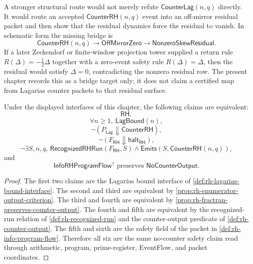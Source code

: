 \begin{remark}
\label{rem:rh-residual-bridge-target}
A stronger structural route would not merely refute
$\mathsf{CounterLag}(n,q)$ directly.  It would route an accepted
$\mathsf{CounterRH}(n,q)$ event into an off-mirror residual packet and then
show that the residual dynamics force the residual to vanish.  In schematic
form the missing bridge is
$$
\mathsf{CounterRH}(n,q)
\to
\mathsf{OffMirrorZero}
\to
\mathsf{NonzeroSkewResidual}.
$$
If a later Zeckendorf or finite-window projection tower supplied a return rule
$R(\Delta)=-\frac{1}{2}\Delta$ together with a zero-event safety rule
$R(\Delta)=\Delta$, then the residual would satisfy $\Delta=0$, contradicting
the nonzero residual row.  The present chapter records this as a bridge
target only; it does not claim a certified map from Lagarias counter packets
to that residual surface.
\end{remark}

\begin{theorem}
\label{thm:rh-information-halting-normal-form}
Under the displayed interfaces of this chapter, the following claims are
equivalent:
$$
\mathsf{RH},
$$
$$
\forall n\geq 1,\ \mathsf{LagBound}(n),
$$
$$
\neg(P_{\mathsf{Lag}}\Downarrow\mathsf{CounterRH}),
$$
$$
\neg(F_{\mathsf{RH}}\Downarrow\mathsf{halt}_{\mathsf{RH}}),
$$
$$
\neg\exists S,n,q,\,
\mathsf{RecognizedRHRun}(F_{\mathsf{RH}},S)
\wedge
\mathsf{Emits}(S,\mathsf{CounterRH}(n,q)),
$$
and
$$
\mathsf{InfoRHProgramFlow}^{\uparrow}
\text{ preserves }\mathsf{NoCounterOutput}.
$$
\end{theorem}

\begin{proof}
The first two claims are the Lagarias bound interface of
\autoref{def:rh-lagarias-bound-interface}.  The second and third are
equivalent by \autoref{prop:rh-enumerator-output-criterion}.  The third and
fourth are equivalent by \autoref{prop:rh-fractran-preserves-counter-output}.
The fourth and fifth are equivalent by the recognized-run relation of
\autoref{def:rh-recognized-run} and the counter-output predicate of
\autoref{def:rh-counter-output}.  The fifth and sixth are the safety field
of the packet in \autoref{def:rh-info-program-flow}.  Therefore all six are
the same no-counter safety claim read through arithmetic, program,
prime-register, EventFlow, and packet coordinates.
\end{proof}

